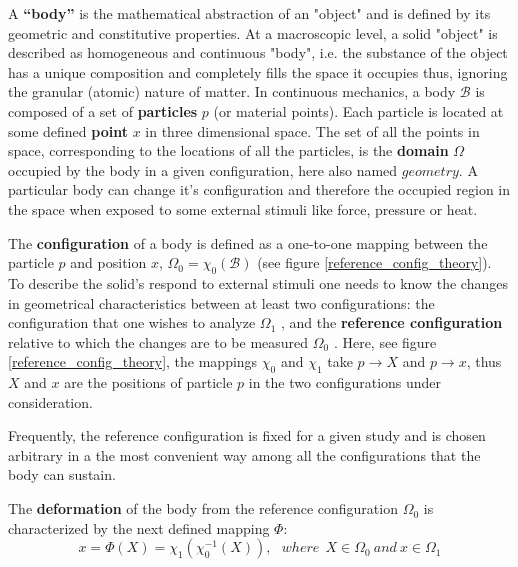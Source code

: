 	A \textbf{“body”} is the mathematical abstraction of an "object" and is defined by its geometric and constitutive properties.  At a macroscopic level, a solid "object" is described as homogeneous and continuous "body", i.e. the substance of the object has a unique composition and completely fills the space it occupies thus, ignoring the granular (atomic) nature of matter. In continuous mechanics, a body $\mathcal{B}$ is composed of a set of \textbf{particles} $p$  (or material points). Each particle is located at some defined \textbf{point}  $x$ in three dimensional space. The set of all the points in space, corresponding to the locations of all the particles, is the \textbf{domain} $\Omega$  occupied by the body in a given configuration, here also named $geometry$. A particular body can change it's configuration and therefore the occupied region in the space when exposed to some external stimuli like force, pressure or heat.
	
 The \textbf{configuration} of a body is defined as a one-to-one mapping between the particle $p$ and position $x$, $\Omega_0 = \chi_0 (\mathcal{B})$ (see figure \ref{reference_config_theory}). To describe the solid's respond to external stimuli one needs to know the changes in geometrical characteristics between at least two configurations: the configuration that one wishes to analyze $\Omega_1$ , and the \textbf{reference configuration} relative to which the changes are to be measured $\Omega_0$  . Here, see figure \ref{reference_config_theory}, the mappings $\chi_0$ and $\chi_1$ take $p \rightarrow X$ and $p \rightarrow x$, thus $X$ and $x$ are the positions of particle $p$ in the two configurations under consideration.

Frequently, the reference configuration is fixed for a given study and is chosen arbitrary in a the most convenient way among all the configurations that the body can sustain. 
 
 The \textbf{deformation} of the body from the reference configuration $\Omega_0$ is characterized by the next defined mapping $\Phi$:
 \begin{equation} 
 x = \Phi(X) = \chi_1(\chi_0^{-1}(X)), \ \ \  where \ \  X \in \Omega_0 \ and \ x \in \Omega_1
 \label{referenceToCurrentCoordinates}
 \end{equation}
 
